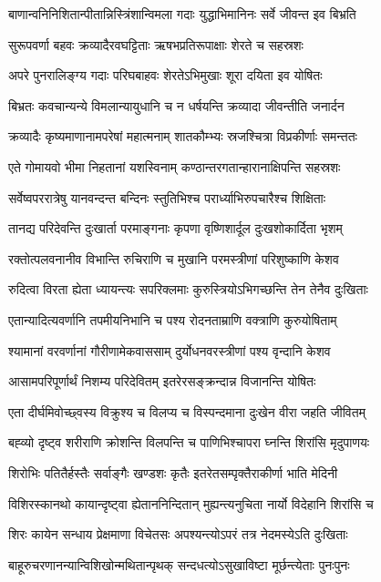 \twolineshloka
{बाणान्वनिनिशितान्पीतान्निस्त्रिंशान्विमला गदाः}
{युद्धाभिमानिनः सर्वे जीवन्त इव बिभ्रति}


\twolineshloka
{सुरूपवर्णा बहवः क्रव्यादैरवघट्टिताः}
{ऋषभप्रतिरूपाक्षाः शेरते च सहस्रशः}


\twolineshloka
{अपरे पुनरालिङ्ग्य गदाः परिघबाहवः}
{शेरतेऽभिमुखाः शूरा दयिता इव योषितः}


\twolineshloka
{बिभ्रतः कवचान्यन्ये विमलान्यायुधानि च}
{न धर्षयन्ति क्रव्यादा जीवन्तीति जनार्दन}


\twolineshloka
{क्रव्यादैः कृष्यमाणानामपरेषां महात्मनाम्}
{शातकौम्भ्यः स्रजश्चित्रा विप्रकीर्णाः समन्ततः}


\twolineshloka
{एते गोमायवो भीमा निहतानां यशस्विनाम्}
{कण्ठान्तरगतान्हारानाक्षिपन्ति सहस्रशः}


\twolineshloka
{सर्वेष्वपररात्रेषु यानवन्दन्त बन्दिनः}
{स्तुतिभिश्च परार्ध्याभिरुपचारैश्च शिक्षिताः}


\twolineshloka
{तानद्य परिदेवन्ति दुःखार्ता परमाङ्गनाः}
{कृपणा वृष्णिशार्दूल दुःखशोकार्दिता भृशम्}


\twolineshloka
{रक्तोत्पलवनानीव विभान्ति रुचिराणि च}
{मुखानि परमस्त्रीणां परिशुष्काणि केशव}


\twolineshloka
{रुदित्वा विरता ह्येता ध्यायन्त्यः सपरिक्लमाः}
{कुरुस्त्रियोऽभिगच्छन्ति तेन तेनैव दुःखिताः}


\twolineshloka
{एतान्यादित्यवर्णानि तपमीयनिभानि च}
{पश्य रोदनताम्राणि वक्त्राणि कुरुयोषिताम्}


\twolineshloka
{श्यामानां वरवर्णानां गौरीणामेकवाससाम्}
{दुर्योधनवरस्त्रीणां पश्य वृन्दानि केशव}


\twolineshloka
{आसामपरिपूर्णार्थं निशम्य परिदेवितम्}
{इतरेरसङ्क्रन्दान्न विजानन्ति योषितः}


\twolineshloka
{एता दीर्घमिवोच्छ्वस्य विक्रुश्य च विलप्य च}
{विस्पन्दमाना दुःखेन वीरा जहति जीवितम्}


\twolineshloka
{बह्व्यो दृष्ट्व शरीराणि क्रोशन्ति विलपन्ति च}
{पाणिभिश्चापरा घ्नन्ति शिरांसि मृदुपाणयः}


\twolineshloka
{शिरोभिः पतितैर्हस्तैः सर्वाङ्गैः खण्डशः कृतैः}
{इतरेतसम्पृक्तैराकीर्णा भाति मेदिनी}


\twolineshloka
{विशिरस्कानथो कायान्दृष्ट्वा ह्येताननिन्दितान्}
{मुह्यन्त्यनुचिता नार्यो विदेहानि शिरांसि च}


\twolineshloka
{शिरः कायेन सन्धाय प्रेक्षमाणा विचेतसः}
{अपश्यन्त्योऽपरं तत्र नेदमस्येऽति दुःखिताः}


\twolineshloka
{बाहूरुचरणानन्यान्विशिखोन्मथितान्पृथक्}
{सन्दधत्योऽसुखाविष्टा मूर्छन्त्येताः पुनःपुनः}


